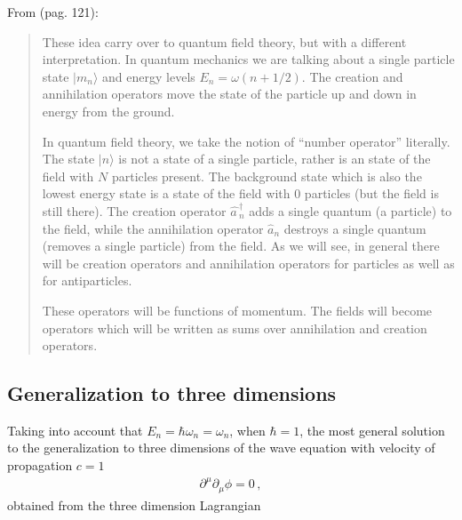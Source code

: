 From \cite{McMahon:2009zz} (pag. 121):
\begin{quote}
  These idea carry over to quantum field theory, but with a different interpretation. In quantum mechanics we are talking about a single particle state $|m_n\rangle$ and energy levels $E_n=\omega(n+1/2)$. The creation and annihilation operators move the state of the particle up and down in energy from the ground.

In quantum field theory, we take the notion of ``number operator'' literally. The state $|n\rangle$ is not a state of a single particle, rather is an state of the field with $N$ particles present. The background state which is also the lowest energy state is a state of the field with 0 particles (but the field is still there). The creation operator $\widehat{a\,}_n^\dagger$ adds a single quantum (a particle) to the field, while the annihilation operator $\widehat{a}_n$ destroys a single quantum (removes a single particle) from the field. As we will see, in general there will be creation operators and annihilation operators for particles as well as for antiparticles.

These operators will be functions of momentum. The fields will become operators which will be written as sums over annihilation and creation operators.
\end{quote}






\subsection{Generalization to three dimensions}
\label{sec:gener-three-dimens}
Taking into account that $E_n=\hbar\omega_n=\omega_n$, when $\hbar=1$, the most general solution to the generalization to three dimensions  of the wave equation with velocity of propagation $c=1$
\begin{align}
  \partial^\mu\partial_\mu\phi=0\,,
\end{align}
obtained from the three dimension Lagrangian 


